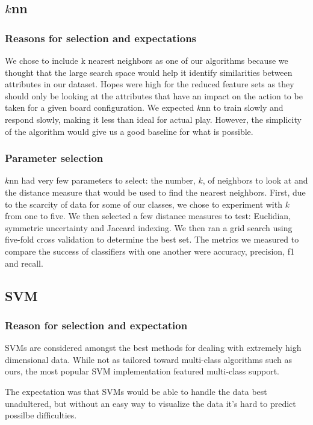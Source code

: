 \documentclass[]{article}   %
\begin{document}
\subsection{$k$nn}
\subsubsection{Reasons for selection and expectations}
We chose to include k nearest neighbors as one of our algorithms because we thought that the large search space 
would help it identify similarities between attributes in our dataset. Hopes were high for the reduced feature 
sets as they should only be looking at the attributes that have an impact on the action to be taken for a given 
board configuration.  We expected $k$nn to train slowly and respond slowly, making it less than ideal for actual play. 
However, the simplicity of the algorithm would give us a good baseline for what is possible.

\subsubsection{Parameter selection}
$k$nn had very few parameters to select: the number, $k$, of neighbors to look at and the distance measure that would 
be used to find the nearest neighbors. First, due to the scarcity of data for some of our classes, we chose to 
experiment with $k$ from one to five. We then selected a few distance measures to test: Euclidian, symmetric uncertainty 
and Jaccard indexing. We then ran a grid search using five-fold cross validation to determine the best set. The metrics 
we measured to compare the success of classifiers with one another were accuracy, precision, f1 and recall. 

\subsection{SVM}
\subsubsection{Reason for selection and expectation}
SVMs are considered amongst the best methods for dealing with extremely high dimensional data.  While not as tailored toward multi-class algorithms such as ours, the most popular SVM implementation featured multi-class support.  

The expectation was that SVMs would be able to handle the data best unadultered, but without an easy way to visualize the data it's hard to predict possilbe difficulties.
\end{document}
